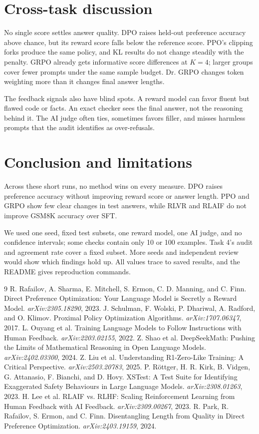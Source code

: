 \documentclass[10pt]{article}
\begin{document}
\section{Cross-task discussion}
No single score settles answer quality. DPO raises held-out preference accuracy above chance, but its reward score falls below the reference score. PPO's clipping forks produce the same policy, and KL results do not change steadily with the penalty. GRPO already gets informative score differences at $K=4$; larger groups cover fewer prompts under the same sample budget. Dr. GRPO changes token weighting more than it changes final answer lengths.

The feedback signals also have blind spots. A reward model can favor fluent but flawed code or facts. An exact checker sees the final answer, not the reasoning behind it. The AI judge often ties, sometimes favors filler, and misses harmless prompts that the audit identifies as over-refusals.

\section{Conclusion and limitations}
Across these short runs, no method wins on every measure. DPO raises preference accuracy without improving reward score or answer length. PPO and GRPO show few clear changes in test answers, while RLVR and RLAIF do not improve GSM8K accuracy over SFT.

We used one seed, fixed test subsets, one reward model, one AI judge, and no confidence intervals; some checks contain only 10 or 100 examples. Task 4's audit and agreement rate cover a fixed subset. More seeds and independent review would show which findings hold up. All values trace to saved results, and the README gives reproduction commands.

\newpage
\begin{thebibliography}{9}\small
{} R. Rafailov, A. Sharma, E. Mitchell, S. Ermon, C. D. Manning, and C. Finn. Direct Preference Optimization: Your Language Model is Secretly a Reward Model. \emph{arXiv:2305.18290}, 2023.
 J. Schulman, F. Wolski, P. Dhariwal, A. Radford, and O. Klimov. Proximal Policy Optimization Algorithms. \emph{arXiv:1707.06347}, 2017.
 L. Ouyang et al. Training Language Models to Follow Instructions with Human Feedback. \emph{arXiv:2203.02155}, 2022.
 Z. Shao et al. DeepSeekMath: Pushing the Limits of Mathematical Reasoning in Open Language Models. \emph{arXiv:2402.03300}, 2024.
 Z. Liu et al. Understanding R1-Zero-Like Training: A Critical Perspective. \emph{arXiv:2503.20783}, 2025.
 P. Röttger, H. R. Kirk, B. Vidgen, G. Attanasio, F. Bianchi, and D. Hovy. XSTest: A Test Suite for Identifying Exaggerated Safety Behaviours in Large Language Models. \emph{arXiv:2308.01263}, 2023.
 H. Lee et al. RLAIF vs. RLHF: Scaling Reinforcement Learning from Human Feedback with AI Feedback. \emph{arXiv:2309.00267}, 2023.
 R. Park, R. Rafailov, S. Ermon, and C. Finn. Disentangling Length from Quality in Direct Preference Optimization. \emph{arXiv:2403.19159}, 2024.
\end{thebibliography}
\end{document}
